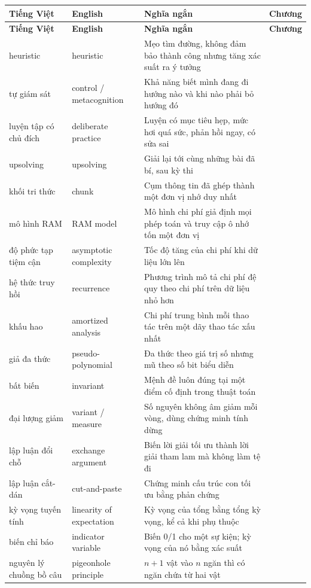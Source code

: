 \documentclass[algorithm.tex]{subfiles}
\begin{document}
\begin{center}\footnotesize
{}
\begin{longtable}{@{}L{3.5cm}L{3.9cm}L{6.2cm}L{1.5cm}@{}}
\toprule
\textbf{Tiếng Việt} & \textbf{English} & \textbf{Nghĩa ngắn} & \textbf{Chương}\\
\midrule
\endfirsthead
\toprule
\textbf{Tiếng Việt} & \textbf{English} & \textbf{Nghĩa ngắn} & \textbf{Chương}\\
\midrule
\endhead
heuristic & heuristic & Mẹo tìm đường, không đảm bảo thành công nhưng tăng xác suất ra ý tưởng & \\
tự giám sát & control / metacognition & Khả năng biết mình đang đi hướng nào và khi nào phải bỏ hướng đó & \\
luyện tập có chủ đích & deliberate practice & Luyện có mục tiêu hẹp, mức hơi quá sức, phản hồi ngay, có sửa sai & \\
upsolving & upsolving & Giải lại tới cùng những bài đã bí, sau kỳ thi & \\
khối tri thức & chunk & Cụm thông tin đã ghép thành một đơn vị nhớ duy nhất & \\
mô hình RAM & RAM model & Mô hình chi phí giả định mọi phép toán và truy cập ô nhớ tốn một đơn vị & \\
độ phức tạp tiệm cận & asymptotic complexity & Tốc độ tăng của chi phí khi dữ liệu lớn lên & \\
hệ thức truy hồi & recurrence & Phương trình mô tả chi phí đệ quy theo chi phí trên dữ liệu nhỏ hơn & \\
khấu hao & amortized analysis & Chi phí trung bình mỗi thao tác trên một dãy thao tác xấu nhất & \\
giả đa thức & pseudo-polynomial & Đa thức theo giá trị số nhưng mũ theo số bit biểu diễn & \\
bất biến & invariant & Mệnh đề luôn đúng tại một điểm cố định trong thuật toán & \\
đại lượng giảm & variant / measure & Số nguyên không âm giảm mỗi vòng, dùng chứng minh tính dừng & \\
lập luận đổi chỗ & exchange argument & Biến lời giải tối ưu thành lời giải tham lam mà không làm tệ đi & \\
lập luận cắt-dán & cut-and-paste & Chứng minh cấu trúc con tối ưu bằng phản chứng & \\
kỳ vọng tuyến tính & linearity of expectation & Kỳ vọng của tổng bằng tổng kỳ vọng, kể cả khi phụ thuộc & \\
biến chỉ báo & indicator variable & Biến 0/1 cho một sự kiện; kỳ vọng của nó bằng xác suất & \\
nguyên lý chuồng bồ câu & pigeonhole principle & \(n+1\) vật vào \(n\) ngăn thì có ngăn chứa từ hai vật & \\
\bottomrule
\end{longtable}
\end{center}
\end{document}
